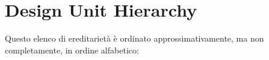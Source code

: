 \section{Design Unit Hierarchy}
Questo elenco di ereditarietà è ordinato approssimativamente, ma non completamente, in ordine alfabetico\+:\begin{DoxyCompactList}
\item {}
\item {}
\begin{DoxyCompactList}
\item {}
\begin{DoxyCompactList}
\item {}
\end{DoxyCompactList}
\end{DoxyCompactList}
\end{DoxyCompactList}
